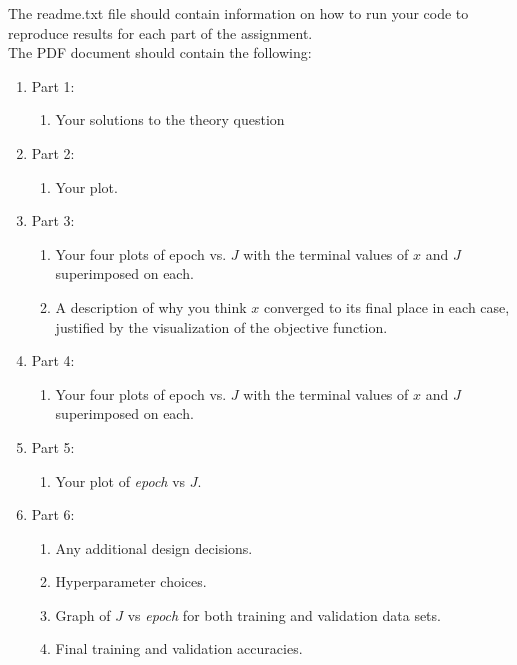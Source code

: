 \documentclass[12pt]{article}
\begin{document}
\noindent
The readme.txt file should contain information on how to run your code to reproduce results for each part of the assignment.\\

\noindent
The PDF document should contain the following:

\begin{enumerate}
\item Part 1:
	\begin{enumerate}
	\item Your solutions to the theory question
	\end{enumerate}
\item Part 2:
	\begin{enumerate}
	\item Your plot.
	\end{enumerate}
\item Part 3:
	\begin{enumerate}
	\item Your four plots of epoch vs. $J$ with the terminal values of $x$ and $J$ superimposed on each.
	\item A description of why you think $x$ converged to its final place in each case, justified by the visualization of the objective function.
	\end{enumerate}	
\item Part 4:
	\begin{enumerate}
	\item Your four plots of epoch vs. $J$ with the terminal values of $x$ and $J$ superimposed on each.
	\end{enumerate}
\item Part 5:
	\begin{enumerate}
	\item Your plot of \emph{epoch} vs $J$.
	\end{enumerate}
\item Part 6:
	\begin{enumerate}
	\item Any additional design decisions.
	\item Hyperparameter choices.
	\item Graph of $J$ vs \emph{epoch} for both training and validation data sets.
	\item Final training and validation accuracies.
	\end{enumerate}
\end{enumerate}
\end{document}

